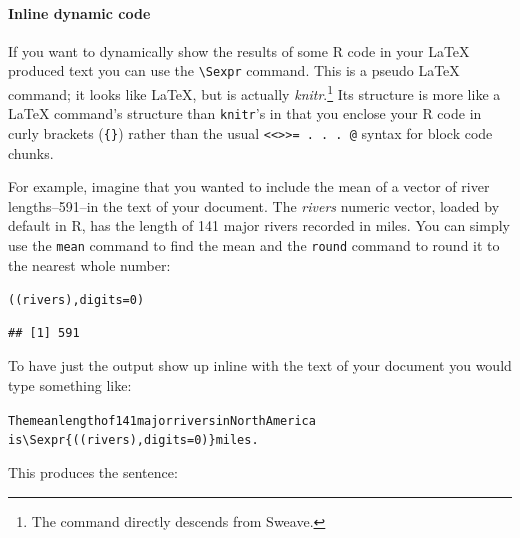 \paragraph{Inline dynamic code}

If you want to dynamically show the results of some R code in your LaTeX produced text you can use the  \texttt{\textbackslash Sexpr} command. This is a pseudo LaTeX command; it looks like LaTeX, but is actually {\emph{knitr}}.\footnote{The command directly descends from Sweave.} Its structure is more like a LaTeX command's structure than \texttt{knitr}'s in that you enclose your R code in curly brackets (\texttt{\{\}}) rather than the usual \texttt{\textless\textless\textgreater\textgreater= . . . @} syntax for block code chunks.

For example, imagine that you wanted to include the mean of a vector of river lengths--591--in the text of your document. The {\emph{rivers}} numeric vector, loaded by default in R, has the length of 141 major rivers recorded in miles. You can simply use the {\tt{mean}} command to find the mean and the {\tt{round}} command to round it to the nearest whole number:

\begin{knitrout}
\color{fgcolor}\begin{kframe}
\begin{alltt}
((rivers), digits = 0)
\end{alltt}
\begin{verbatim}
## [1] 591
\end{verbatim}
\end{kframe}
\end{knitrout}


\noindent To have just the output show up inline with the text of your document you would type something like:

\begin{knitrout}
\color{fgcolor}\begin{kframe}
\begin{alltt}
The mean length of 141 major rivers in North America
is \textbackslash{}Sexpr\{((rivers), digits = 0)\} miles. 
\end{alltt}
\end{kframe}
\end{knitrout}


\noindent This produces the sentence:


